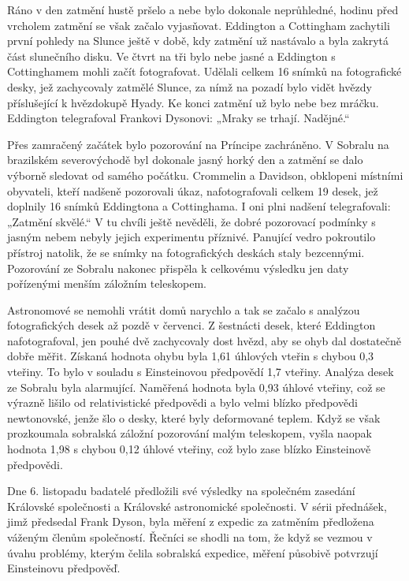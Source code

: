   
  Ráno v den zatmění hustě pršelo a nebe bylo dokonale neprůhledné, hodinu před vrcholem zatmění se
  však začalo vyjasňovat. Eddington a Cottingham zachytili první pohledy na Slunce ještě v době, kdy
  zatmění už nastávalo a byla zakrytá část slunečního disku. Ve čtvrt na tři bylo nebe jasné a
  Eddington s Cottinghamem mohli začít fotografovat. Udělali celkem 16 snímků na fotografické desky,
  jež zachycovaly zatmělé Slunce, za nímž na pozadí bylo vidět hvězdy příslušející k hvězdokupě
  Hyady. Ke konci zatmění už bylo nebe bez mráčku. Eddington telegrafoval Frankovi Dysonovi: „Mraky
  se trhají. Nadějné.“
  
  Přes zamračený začátek bylo pozorování na Príncipe zachráněno. V Sobralu na brazilském
  severovýchodě byl dokonale jasný horký den a zatmění se dalo výborně sledovat od samého počátku.
  Crommelin a Davidson, obklopeni místními obyvateli, kteří nadšeně pozorovali úkaz, nafotografovali
  celkem 19 desek, jež doplnily 16 snímků Eddingtona a Cottinghama. I oni plni nadšení
  telegrafovali: „Zatmění skvělé.“ V tu chvíli ještě nevěděli, že dobré pozorovací podmínky s jasným
  nebem nebyly jejich experimentu příznivé. Panující vedro pokroutilo přístroj natolik, že se snímky
  na fotografických deskách staly bezcennými. Pozorování ze Sobralu nakonec přispěla k celkovému
  výsledku jen daty pořízenými menším záložním teleskopem. 
  
  Astronomové se nemohli vrátit domů narychlo a tak se začalo s analýzou fotografických desek až
  pozdě v červenci. Z šestnácti desek, které Eddington nafotografoval, jen pouhé dvě zachycovaly
  dost hvězd, aby se ohyb dal dostatečně dobře měřit. Získaná hodnota ohybu byla 1,61 úhlových
  vteřin s chybou 0,3 vteřiny. To bylo v souladu s Einsteinovou předpovědí 1,7 vteřiny. Analýza
  desek ze Sobralu byla alarmující. Naměřená hodnota byla 0,93 úhlové vteřiny, což se výrazně lišilo
  od relativistické předpovědi a bylo velmi blízko předpovědi newtonovské, jenže šlo o desky, které
  byly deformované teplem. Když se však prozkoumala sobralská záložní pozorování malým teleskopem,
  vyšla naopak hodnota 1,98 s chybou 0,12 úhlové vteřiny, což bylo zase blízko Einsteinově
  předpovědi. 

  Dne 6. listopadu badatelé předložili své výsledky na společném zasedání Královské společnosti a
  Královské astronomické společnosti. V sérii přednášek, jimž předsedal Frank Dyson, byla měření z
  expedic za zatměním předložena váženým členům společností. Řečníci se shodli na tom, že když se
  vezmou v úvahu problémy, kterým čelila sobralská expedice, měření působivě potvrzují Einsteinovu
  předpověď. 
  
